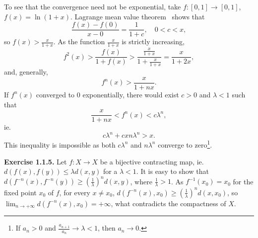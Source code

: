 To see that the convergence need not be exponential, take $f \colon
[0, 1] \to [0, 1]$, $f(x) = \ln (1 + x)$. Lagrange mean value
theorem~\cite [p.~145] {rudnicki-2012} shows that \[ \frac{f(x) -
  f(0)}{x - 0} = \frac{1}{1 + c}, \quad 0 < c < x, \] so $f(x) >
\frac{x}{1 + x}$. As the function $\frac{x}{1 + x}$ is strictly
increasing, \[ f^2(x) > \frac{f(x)}{1 + f(x)} > \frac{\frac{x}{1 +
    x}}{1 + \frac{x}{1 + x}} = \frac{x}{1 + 2x}, \] and, generally, \[
f^n(x) > \frac{x}{1 + nx}. \] If $f^n(x)$ converged to 0
exponentially, there would exist $c > 0$ and $\lambda < 1$ such
that \[ \frac{x}{1 + nx} < f^n(x) < c \lambda^n, \] ie. \[ c \lambda^n
+ cx n \lambda^n > x. \] This inequality is impossible as both
$c\lambda^n$ and $n\lambda^n$ converge to zero\footnote{If $a_n > 0$
  and $\frac{a_{n + 1}}{a_n} \to \lambda < 1$, then $a_n \to 0$.}.

\textbf{Exercise 1.1.5.} Let $f \colon X \to X$ be a bijective
contracting map, ie. $d(f(x), f(y)) \leq \lambda d(x, y)$ for a
$\lambda < 1$. It is easy to show that $d(f^{-n}(x), f^{-n}(y)) \geq
\left( \frac{1}{\lambda} \right)^n d(x, y)$, where $\frac{1}{\lambda}
> 1$. As $f^{-1}(x_0) = x_0$ for the fixed point $x_0$ of $f$, for
every $x \neq x_0$, $d(f^{-n}(x), x_0) \geq \left( \frac{1}{\lambda}
\right)^n d(x, x_0)$, so $\lim_{n \to +\infty} d(f^{-n}(x), x_0) =
+\infty$, what contradicts the compactness of $X$.

